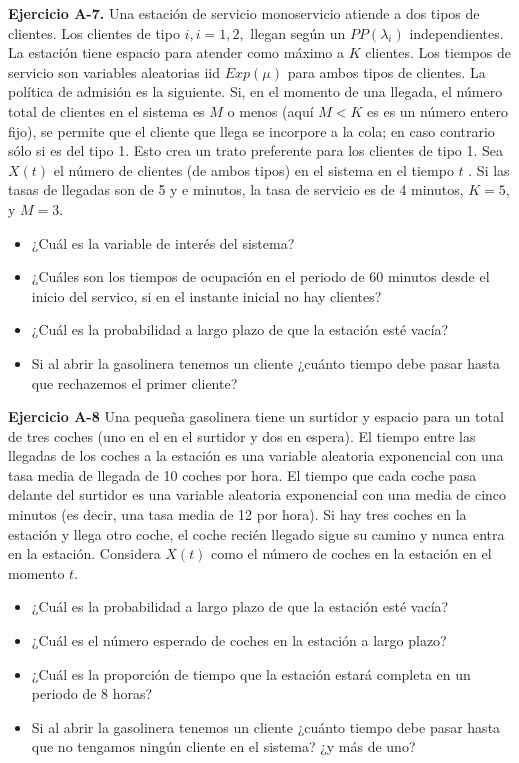 \documentclass[
]{book}
\providecommand{\tightlist}{%
  \setlength{\itemsep}{0pt}\setlength{\parskip}{0pt}}
\theoremstyle{definition}
\theoremstyle{definition}
\theoremstyle{definition}
\theoremstyle{definition}
\theoremstyle{remark}
\begin{document}
\textbf{Ejercicio A-7.} Una estación de servicio monoservicio atiende a dos tipos de clientes. Los clientes de tipo \(i, i = 1, 2,\) llegan según un \(PP(\lambda_i)\) independientes. La estación tiene espacio para atender como máximo a \(K\) clientes. Los tiempos de servicio son variables aleatorias iid \(Exp(\mu)\) para ambos tipos de clientes. La política de admisión es la siguiente. Si, en el momento de una llegada, el número total de clientes en el sistema es \(M\) o menos (aquí \(M < K\) es es un número entero fijo), se permite que el cliente que llega se incorpore a la
cola; en caso contrario sólo si es del tipo 1. Esto crea un trato preferente para los clientes de tipo 1. Sea \(X(t)\) el número de clientes (de ambos tipos) en el sistema en el tiempo \(t\) . Si las tasas de llegadas son de 5 y e minutos, la tasa de servicio es de 4 minutos, \(K = 5\), y \(M = 3\).

\begin{itemize}
\tightlist
\item
  ¿Cuál es la variable de interés del sistema?
\item
  ¿Cuáles son los tiempos de ocupación en el periodo de 60 minutos desde el inicio del servico, si en el instante inicial no hay clientes?
\item
  ¿Cuál es la probabilidad a largo plazo de que la estación esté vacía?
\item
  Si al abrir la gasolinera tenemos un cliente ¿cuánto tiempo debe pasar hasta que rechazemos el primer cliente?
\end{itemize}

\textbf{Ejercicio A-8} Una pequeña gasolinera tiene un surtidor y espacio para un total de tres coches (uno en el en el surtidor y dos en espera). El tiempo entre las llegadas de los coches a la estación es una variable aleatoria exponencial con una tasa media de llegada de 10 coches por hora. El tiempo que cada coche pasa delante del surtidor es una variable aleatoria exponencial con una media de cinco minutos (es decir, una tasa media de 12 por hora). Si hay tres coches en la estación y llega otro coche, el coche recién llegado sigue su camino y nunca entra en la estación. Considera \(X(t)\) como el número de coches en la estación en el momento \(t\).

\begin{itemize}
\tightlist
\item
  ¿Cuál es la probabilidad a largo plazo de que la estación esté vacía?
\item
  ¿Cuál es el número esperado de coches en la estación a largo plazo?
\item
  ¿Cuál es la proporción de tiempo que la estación estará completa en un periodo de 8 horas?
\item
  Si al abrir la gasolinera tenemos un cliente ¿cuánto tiempo debe pasar hasta que no tengamos ningún cliente en el sistema? ¿y más de uno?
\end{itemize}
\end{document}
